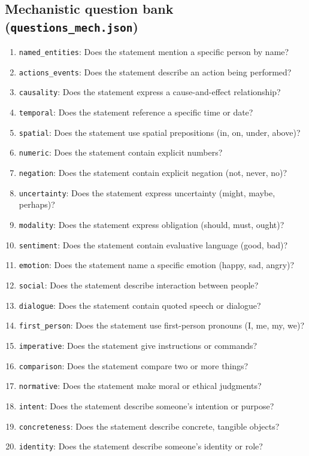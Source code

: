 \documentclass[11pt]{article}
\begin{document}
\subsection{Mechanistic question bank (\texttt{questions\_mech.json})}
\begin{enumerate}\itemsep0pt
\item \texttt{named\_entities}: Does the statement mention a specific person by name?
\item \texttt{actions\_events}: Does the statement describe an action being performed?
\item \texttt{causality}: Does the statement express a cause-and-effect relationship?
\item \texttt{temporal}: Does the statement reference a specific time or date?
\item \texttt{spatial}: Does the statement use spatial prepositions (in, on, under, above)?
\item \texttt{numeric}: Does the statement contain explicit numbers?
\item \texttt{negation}: Does the statement contain explicit negation (not, never, no)?
\item \texttt{uncertainty}: Does the statement express uncertainty (might, maybe, perhaps)?
\item \texttt{modality}: Does the statement express obligation (should, must, ought)?
\item \texttt{sentiment}: Does the statement contain evaluative language (good, bad)?
\item \texttt{emotion}: Does the statement name a specific emotion (happy, sad, angry)?
\item \texttt{social}: Does the statement describe interaction between people?
\item \texttt{dialogue}: Does the statement contain quoted speech or dialogue?
\item \texttt{first\_person}: Does the statement use first-person pronouns (I, me, my, we)?
\item \texttt{imperative}: Does the statement give instructions or commands?
\item \texttt{comparison}: Does the statement compare two or more things?
\item \texttt{normative}: Does the statement make moral or ethical judgments?
\item \texttt{intent}: Does the statement describe someone's intention or purpose?
\item \texttt{concreteness}: Does the statement describe concrete, tangible objects?
\item \texttt{identity}: Does the statement describe someone's identity or role?
\end{enumerate}
\end{document}
